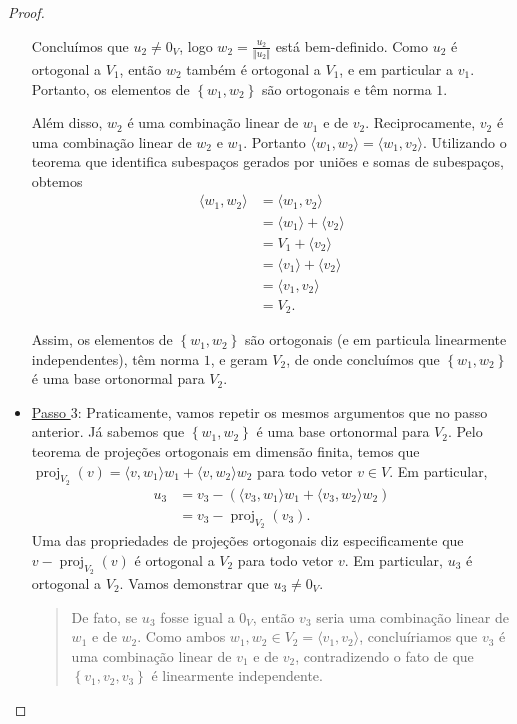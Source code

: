 \begin{proof}
\begin{itemize}
		Concluímos que $u_2\neq 0_V$, logo $w_2=\frac{u_2}{\Vert u_2\Vert}$ está bem-definido. Como $u_2$ é ortogonal a $V_1$, então $w_2$ também é ortogonal a $V_1$, e em particular a $v_1$. Portanto, os elementos de $\left\{w_1,w_2\right\}$ são ortogonais e têm norma $1$.
		
		Além disso, $w_2$ é uma combinação linear de $w_1$ e de $v_2$. Reciprocamente, $v_2$ é uma combinação linear de $w_2$ e $w_1$. Portanto $\langle w_1,w_2\rangle=\langle w_1,v_2\rangle$. Utilizando o teorema que identifica subespaços gerados por uniões e somas de subespaços, obtemos
		\begin{align*}
			\langle w_1,w_2\rangle
				&=\langle w_1,v_2\rangle\\
				&=\langle w_1\rangle +\langle v_2\rangle\\
				&=V_1+\langle v_2\rangle\\
				&=\langle v_1\rangle+\langle v_2\rangle\\
				&=\langle v_1,v_2\rangle\\
				&=V_2.
		\end{align*}
		
		Assim, os elementos de $\left\{w_1,w_2\right\}$ são ortogonais (e em particula linearmente independentes), têm norma $1$, e geram $V_2$, de onde concluímos que $\left\{w_1,w_2\right\}$ é uma base ortonormal para $V_2$.
		
		\item \uline{Passo $3$}: Praticamente, vamos repetir os mesmos argumentos que no passo anterior. Já sabemos que $\left\{w_1,w_2\right\}$ é uma base ortonormal para $V_2$. Pelo teorema de projeções ortogonais em dimensão finita, temos que $\operatorname{proj}_{V_2}(v)=\langle v,w_1\rangle w_1+\langle v,w_2\rangle w_2$ para todo vetor $v\in V$. Em particular,
		\begin{align*}
			u_3
				&=v_3-\left(\langle v_3,w_1\rangle w_1+\langle v_3,w_2\rangle w_2\right)\\
				&=v_3-\operatorname{proj}_{V_2}(v_3).
			\end{align*}
		Uma das propriedades de projeções ortogonais diz especificamente que $v-\operatorname{proj}_{V_2}(v)$ é ortogonal a $V_2$ para todo vetor $v$. Em particular, $u_3$ é ortogonal a $V_2$. Vamos demonstrar que $u_3\neq 0_V$.
		
		\begin{quote}
			De fato, se $u_3$ fosse igual a $0_V$, então $v_3$ seria uma combinação linear de $w_1$ e de $w_2$. Como ambos $w_1,w_2\in V_2=\langle v_1,v_2\rangle$, concluíriamos que $v_3$ é uma combinação linear de $v_1$ e de $v_2$, contradizendo o fato de que $\left\{v_1,v_2,v_3\right\}$ é linearmente independente.
		\end{quote}
		

\end{itemize}
\end{proof}
